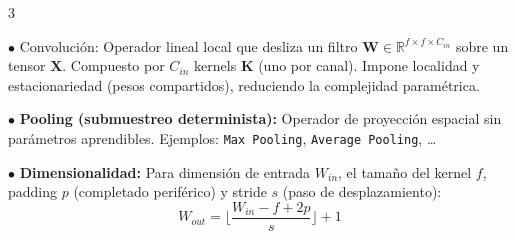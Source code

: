 \documentclass[8pt,a4paper,landscape,fleqn]{extarticle}
\begin{document}
\begin{multicols*}{3}
\begin{minipage}{9.9cm}
{
    }

\end{minipage}
\shorthandon{<>}

$\bullet$ Convolución: Operador lineal local que desliza un filtro $\mathbf{W} \in \mathbb{R}^{f \times f \times C_{in}}$ sobre un tensor $\mathbf{X}$. Compuesto por $C_{in}$ kernels $\mathbf{K}$ (uno por canal). Impone localidad y estacionariedad (pesos compartidos), reduciendo la complejidad paramétrica.

$\bullet$ \textbf{Pooling (submuestreo determinista):} Operador de proyección espacial sin parámetros aprendibles. Ejemplos: \texttt{Max Pooling}, \texttt{Average Pooling}, \dots

$\bullet$ \textbf{Dimensionalidad:} Para dimensión de entrada $W_{in}$, el tamaño del kernel $f$, padding $p$ (completado periférico) y stride $s$ (paso de desplazamiento):
$$ W_{out} = \lfloor \frac{W_{in} - f + 2p}{s} \rfloor + 1 $$



\end{multicols*}
\end{document}
